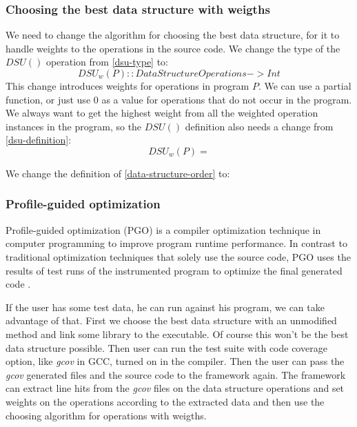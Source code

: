 \documentclass[11pt]{article}
\begin{document}
		\subsubsection{Choosing the best data structure with weigths}
			We need to change the algorithm for choosing the best data structure, for it to handle
			weights to the operations in the source code. We change the type of the $DSU()$ operation from
			\ref{dsu-type} to:
			\begin{equation}
				DSU_w(P) :: DataStructureOperations -> Int
			\end{equation}
			This change introduces weights for operations in program $P$. We can use a partial function,
			or just use $0$ as a value for operations that do not occur in the program. We always want to
			get the highest weight from all the weighted operation instances in the program, so the $DSU()$
			definition also needs a change from \ref{dsu-definition}:
			\begin{equation}
				DSU_w(P) =
			\end{equation}

			We change the definition of \autoref{data-structure-order} to:
			\begin{equation}
			\end{equation}

		\subsubsection{Profile-guided optimization}
			Profile-guided optimization (PGO) is a compiler optimization technique in computer programming to improve program runtime performance.
			In contrast to traditional optimization techniques that solely use the source code, PGO uses the results of test runs of the
			instrumented program to optimize the final generated code .

			If the user has some test data, he can run against his program, we can take advantage of that. First we choose the best data structure
			with an unmodified method and link some library to the executable. Of course this won't be the best data structure possible. Then user
			can run the test suite with code coverage option, like \emph{gcov} in GCC, turned on in the compiler.
			Then the user can pass the \emph{gcov} generated files and the source code to the framework again. The framework can extract line hits
			from the \emph{gcov} files on the data structure operations and set weights on the operations according to the extracted data and then
			use the choosing algorithm for operations with weigths.
\end{document}
